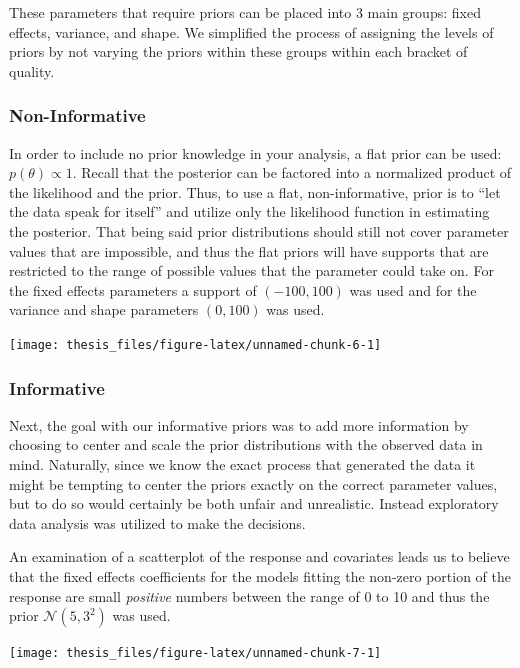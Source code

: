 \documentclass[12pt,twoside]{reedthesis}
\begin{document}
These parameters that require priors can be placed into 3 main groups: fixed effects, variance, and shape. We simplified the process of assigning the levels of priors by not varying the priors within these groups within each bracket of quality.

\hypertarget{non-informative}{%
\subsubsection{Non-Informative}\label{non-informative}}

In order to include no prior knowledge in your analysis, a flat prior can be used: \(p(\theta) \propto 1\). Recall that the posterior can be factored into a normalized product of the likelihood and the prior. Thus, to use a flat, non-informative, prior is to ``let the data speak for itself'' and utilize only the likelihood function in estimating the posterior. That being said prior distributions should still not cover parameter values that are impossible, and thus the flat priors will have supports that are restricted to the range of possible values that the parameter could take on. For the fixed effects parameters a support of \((-100, 100)\) was used and for the variance and shape parameters \((0, 100)\) was used.
\begin{center}\texttt{[image: thesis\_files/figure-latex/unnamed-chunk-6-1]} \end{center}

\hypertarget{info}{%
\subsubsection{Informative}\label{info}}

Next, the goal with our informative priors was to add more information by choosing to center and scale the prior distributions with the observed data in mind. Naturally, since we know the exact process that generated the data it might be tempting to center the priors exactly on the correct parameter values, but to do so would certainly be both unfair and unrealistic. Instead exploratory data analysis was utilized to make the decisions.

An examination of a scatterplot of the response and covariates leads us to believe that the fixed effects coefficients for the models fitting the non-zero portion of the response are small \emph{positive} numbers between the range of 0 to 10 and thus the prior \(\mathcal{N}(5, 3^2)\) was used.
\begin{center}\texttt{[image: thesis\_files/figure-latex/unnamed-chunk-7-1]} \end{center}
\end{document}
